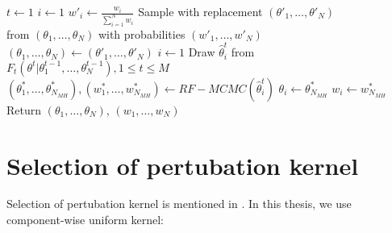 \begin{algorithm}                     
\begin{algorithmic}[H]
        \State $t \leftarrow 1$
            \State $i \leftarrow 1$ 
                \State $w'_i \leftarrow \frac{w_i}{\sum_{i=1}^N w_i} $
            \EndWhile
            \State Sample with replacement $(\theta'_1,\ldots,\theta'_N)$  \\\hspace{1.5cm} from $(\theta_1,\ldots,\theta_N)$ with probabilities $(w'_1,\ldots,w'_N)$ 
            \State $(\theta_1,\ldots,\theta_N) \leftarrow (\theta'_1,\ldots,\theta'_N)$ 
            \State $i \leftarrow 1$
             
                \State Draw $\hat{\theta}^t_i$ from $F_t(\theta^t | \theta^{t-1}_1,\ldots,\theta^{t-1}_N), 1\leq t \leq M$
                \State $(\theta^*_1,\ldots,\theta^*_{N_{MH}}), (w^*_1,\ldots,w^*_{N_{MH}}) \leftarrow RF-MCMC(\hat{\theta}^t_i)$
                \State $\theta_i \leftarrow \theta^*_{N_{MH}}$
                \State $w_i \leftarrow w^*_{N_{MH}}$
            \EndWhile
        \EndWhile
        \State Return $(\theta_1,\ldots,\theta_{N})$, $(w_1,\ldots,w_{N})$
        \EndProcedure
    \end{algorithmic}
\end{algorithm}

\section{Selection of pertubation kernel}
Selection of pertubation kernel is mentioned in \cite{filippi2013optimality}. In this thesis, we use
component-wise uniform kernel:
